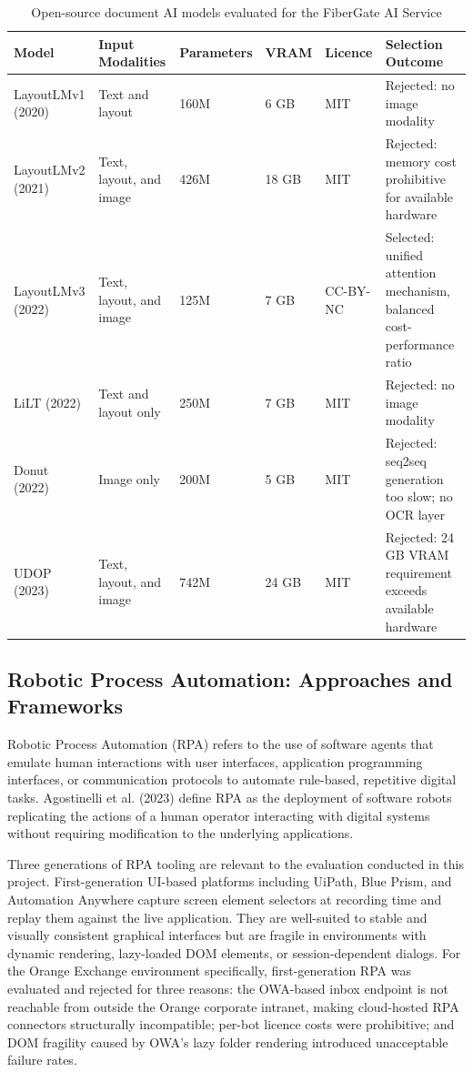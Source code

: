 \begin{table}[H]
  \centering
  \caption{Open-source document AI models evaluated for the FiberGate AI Service}
  \renewcommand{\arraystretch}{1.0}
  \footnotesize
  \begin{tabularx}{\textwidth}{|X|X|X|X|X|X|}
    \hline
    \textbf{Model} & \textbf{Input Modalities} & \textbf{Parameters} & \textbf{VRAM} & \textbf{Licence} & \textbf{Selection Outcome} \\ \hline
    LayoutLMv1 (2020) & Text and layout & 160M & 6 GB & MIT & Rejected: no image modality \\ \hline
    LayoutLMv2 (2021) & Text, layout, and image & 426M & 18 GB & MIT & Rejected: memory cost prohibitive for available hardware \\ \hline
    LayoutLMv3 (2022) & Text, layout, and image & 125M & 7 GB & CC-BY-NC & Selected: unified attention mechanism, balanced cost-performance ratio \\ \hline
    LiLT (2022) & Text and layout only & 250M & 7 GB & MIT & Rejected: no image modality \\ \hline
    Donut (2022) & Image only & 200M & 5 GB & MIT & Rejected: seq2seq generation too slow; no OCR layer \\ \hline
    UDOP (2023) & Text, layout, and image & 742M & 24 GB & MIT & Rejected: 24 GB VRAM requirement exceeds available hardware \\ \hline
  \end{tabularx}
\end{table}

\subsection{Robotic Process Automation: Approaches and Frameworks}

Robotic Process Automation (RPA) refers to the use of software agents that emulate human interactions with user interfaces, application programming interfaces, or communication protocols to automate rule-based, repetitive digital tasks. Agostinelli et al. (2023) define RPA as the deployment of software robots replicating the actions of a human operator interacting with digital systems without requiring modification to the underlying applications.

Three generations of RPA tooling are relevant to the evaluation conducted in this project. First-generation UI-based platforms including UiPath, Blue Prism, and Automation Anywhere capture screen element selectors at recording time and replay them against the live application. They are well-suited to stable and visually consistent graphical interfaces but are fragile in environments with dynamic rendering, lazy-loaded DOM elements, or session-dependent dialogs. For the Orange Exchange environment specifically, first-generation RPA was evaluated and rejected for three reasons: the OWA-based inbox endpoint is not reachable from outside the Orange corporate intranet, making cloud-hosted RPA connectors structurally incompatible; per-bot licence costs were prohibitive; and DOM fragility caused by OWA's lazy folder rendering introduced unacceptable failure rates.

